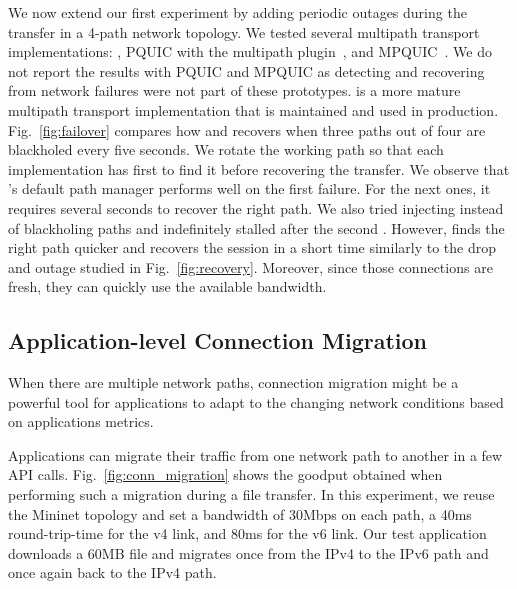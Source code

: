 We now extend our first experiment by adding periodic outages during the 
transfer in a 4-path network topology.
We tested several multipath transport implementations: \mptcp, PQUIC with the 
multipath
plugin~\cite{de2019pluginizing}, and MPQUIC~\cite{de2017multipath}.
We do not report the results with PQUIC and MPQUIC as 
detecting and recovering from network failures were not part of these 
prototypes.
\mptcp is a more mature multipath transport implementation that is maintained 
and used in production. Fig.~\ref{fig:failover} compares how 
\mptcp and \tcpls recovers when three paths out of four are blackholed every 
five seconds. We rotate the working path so that each implementation has 
first to find it before recovering the transfer. 
We observe that \mptcp's default path manager performs well on the first
failure. For the next ones, it requires several seconds to recover the right 
path. 
We also tried injecting \tcp \rst instead of blackholing paths and \mptcp 
indefinitely stalled after the second \rst.
However, \tcpls finds the right path quicker and recovers the session in a 
short time similarly to the drop and \rst outage studied in 
Fig.~\ref{fig:recovery}. Moreover, since those connections are fresh, they can 
quickly use the available bandwidth.

\subsection{Application-level Connection Migration}
\label{sec:app-migration}

When there are multiple network paths, connection migration might be a
powerful tool for applications to adapt to the changing network conditions 
based on applications metrics.

Applications can migrate their traffic from 
one network path to another in a few \tcpls API calls. 
Fig.~\ref{fig:conn_migration} shows the goodput 
obtained when performing such a migration during a file transfer. %
In this experiment, we reuse the Mininet topology %
and set a bandwidth of 30Mbps on each path, a 40ms 
round-trip-time for the v4 link, and 80ms for the v6 link. Our test application 
downloads a 60MB file and migrates once from the IPv4 to 
the IPv6 path and once again back to the IPv4 path.

